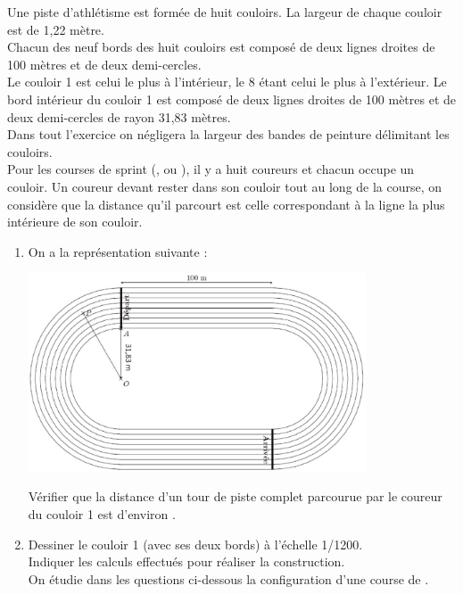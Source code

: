 {\bigskip


\begin{exercice}[CRPE 2018 G3] %
   Une piste d'athlétisme est formée de huit couloirs. La largeur de chaque couloir est de 1,22 mètre. \\
   Chacun des neuf bords des huit couloirs est composé de deux lignes droites de 100 mètres et de deux demi-cercles. \\
   Le couloir 1 est celui le plus à l'intérieur, le 8 étant celui le plus à l'extérieur. Le bord intérieur du couloir 1 est composé de deux lignes droites de 100 mètres et de deux demi-cercles de rayon 31,83 mètres. \\
   Dans tout l’exercice on négligera la largeur des bandes de peinture délimitant les couloirs. \\
   Pour les courses de sprint (,  ou ), il y a huit coureurs et chacun occupe un couloir. Un coureur devant rester dans son couloir tout au long de la course, on considère que la distance qu'il parcourt est celle correspondant à la ligne la plus intérieure de son couloir. 
   \begin{enumerate}
      \item On a la représentation suivante :
         \begin{center}
            \includegraphics[width=10cm]{Grandeurs_mesures/Images/M13_ex_piste_athle}
         \end{center}
         Vérifier que la distance d’un tour de piste complet parcourue par le coureur du couloir 1 est d’environ .
      \item Dessiner le couloir 1 (avec ses deux bords) à l’échelle 1/1200. \\
         Indiquer les calculs effectués pour réaliser la construction. \\
\hspace*{-5mm} On étudie dans les questions ci-dessous la configuration d’une course de .

\end{enumerate}
\end{exercice}}
